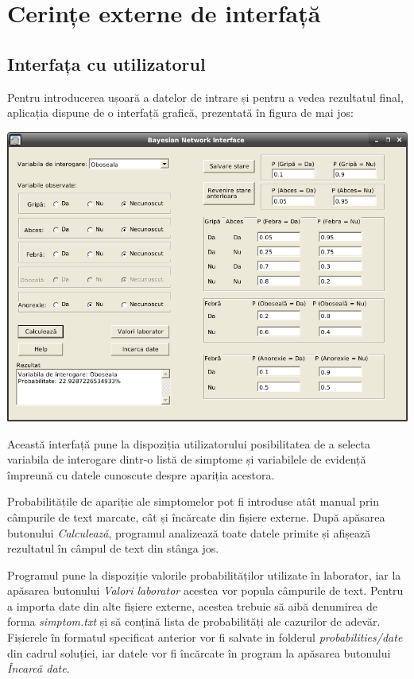\documentclass{scrreprt}
\begin{document}
\chapter{Cerințe externe de interfață}

\section{Interfața cu utilizatorul}
Pentru introducerea ușoară a datelor de intrare și pentru a vedea rezultatul final, aplicația dispune de o interfață grafică, prezentată în figura de mai jos:

\begin{center}
	\includegraphics [scale=0.5] {img/gui.png}
\end{center}

Această interfață pune la dispoziția utilizatorului posibilitatea de a selecta variabila de interogare dintr-o listă de simptome și variabilele de evidență împreună cu datele cunoscute despre apariția acestora.

Probabilitățile de apariție ale simptomelor pot fi introduse atât manual prin câmpurile de text marcate, cât și încărcate din fișiere externe. După apăsarea butonului \textit{Calculează}, programul analizează toate datele primite și afișează rezultatul în câmpul de text din stânga jos.

Programul pune la dispoziție valorile probabilităților utilizate în laborator, iar la apăsarea butonului \textit{Valori laborator} acestea vor popula câmpurile de text. Pentru a importa date din alte fișiere externe, acestea trebuie să aibă denumirea de forma \textit{simptom.txt} și să conțină lista de probabilități ale cazurilor de adevăr. Fișierele în formatul specificat anterior vor fi salvate in folderul \textit{probabilities/date} din cadrul soluției, iar datele vor fi încărcate în program la apăsarea butonului \textit{Încarcă date}.
\end{document}

